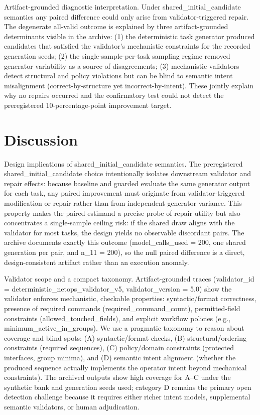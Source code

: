 \documentclass[conference]{IEEEtran}
\begin{document}
Artifact-grounded diagnostic interpretation. Under shared\_initial\_candidate semantics any paired difference could only arise from validator-triggered repair. The degenerate all-valid outcome is explained by three artifact-grounded determinants visible in the archive: (1) the deterministic task generator produced candidates that satisfied the validator's mechanistic constraints for the recorded generation seeds; (2) the single-sample-per-task sampling regime removed generator variability as a source of disagreements; (3) mechanistic validators detect structural and policy violations but can be blind to semantic intent misalignment (correct-by-structure yet incorrect-by-intent). These jointly explain why no repairs occurred and the confirmatory test could not detect the preregistered 10-percentage-point improvement target.

\section{Discussion}
Design implications of shared\_initial\_candidate semantics. The preregistered shared\_initial\_candidate choice intentionally isolates downstream validator and repair effects: because baseline and guarded evaluate the same generator output for each task, any paired improvement must originate from validator-triggered modification or repair rather than from independent generator variance. This property makes the paired estimand a precise probe of repair utility but also concentrates a single-sample ceiling risk: if the shared draw aligns with the validator for most tasks, the design yields no observable discordant pairs. The archive documents exactly this outcome (model\_calls\_used = 200, one shared generation per pair, and n\_11 = 200), so the null paired difference is a direct, design-consistent artifact rather than an execution anomaly.

Validator scope and a compact taxonomy. Artifact-grounded traces (validator\_id = deterministic\_netops\_validator\_v5, validator\_version = 5.0) show the validator enforces mechanistic, checkable properties: syntactic/format correctness, presence of required commands (required\_command\_count), permitted-field constraints (allowed\_touched\_fields), and explicit workflow policies (e.g., minimum\_active\_in\_groups). We use a pragmatic taxonomy to reason about coverage and blind spots: (A) syntactic/format checks, (B) structural/ordering constraints (required sequences), (C) policy/domain constraints (protected interfaces, group minima), and (D) semantic intent alignment (whether the produced sequence actually implements the operator intent beyond mechanical constraints). The archived outputs show high coverage for A--C under the synthetic bank and generation seeds used; category D remains the primary open detection challenge because it requires either richer intent models, supplemental semantic validators, or human adjudication.
\end{document}
